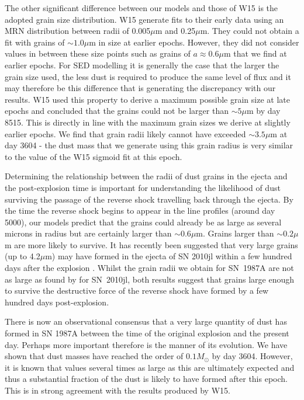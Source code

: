 \documentclass[useAMS,usenatbib,usegraphicx]{mnras}
\begin{document}
The other significant difference between our models and those of W15 is the adopted grain 
size distribution.  W15 generate fits to their early data using an MRN 
distribution between radii of 0.005$\mu$m and 0.25$\mu$m.  They could not 
obtain a fit with grains of $\sim 1.0 \mu$m in size at earlier epochs.  
However, they did not consider values in between these size points such as grains
 of $a \approx 0.6\mu$m that we find at earlier epochs.  For 
SED modelling it is generally the case that the larger the grain size 
used, the less dust is required to produce the same level of flux and it 
may therefore be this difference that is generating the discrepancy with our 
results.  W15 used this property to derive a maximum possible grain size at 
late epochs and concluded that the grains could not be larger than $\sim 
5\mu$m by day 8515.  This is directly in line with the maximum grain sizes 
we derive at slightly earlier epochs.  We find that grain radii likely 
cannot have exceeded $\sim 3.5\mu$m at day 3604 - the dust mass that 
we generate using this grain radius is very similar to the value of the W15 
sigmoid fit at this epoch.


Determining the relationship between the radii of dust grains in the ejecta 
and the  post-explosion time is important for understanding the likelihood 
of dust surviving the passage of the reverse shock travelling back through 
the ejecta. By the time the reverse shock begins to appear in the line 
profiles (around day 5000), our models predict that the grains could 
already be as large as several microns in radius but are certainly larger 
than $\sim 0.6\mu$m.  Grains larger than $\sim 0.2\mu$m are more likely to 
survive.  It has recently been 
suggested that very large grains (up to 4.2$\mu$m) may have formed in the 
ejecta of SN 2010jl within a few hundred days after the explosion \cite{Gall2014}.
Whilst the grain radii we obtain for SN~1987A are not as large as found by \citet{Gall2014} for SN~2010jl,
 both results suggest that grains large enough to survive the 
destructive force of the reverse shock have formed by a few hundred days 
post-explosion.

There is now an observational consensus that a very large quantity of dust has 
formed in SN 1987A between the time of the original explosion and the 
present day.  Perhaps more important therefore is the manner of its 
evolution.  We have shown that dust masses have reached the order of 
$0.1M_{\odot}$ by day 3604.  However, it is known that values several 
times as large as this are ultimately expected and thus a substantial 
fraction of the dust is likely to have formed after this epoch.  This is in 
strong agreement with the results produced by W15. 
\end{document}
